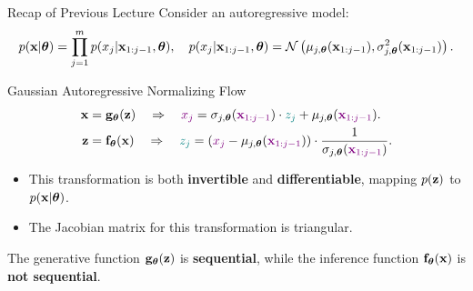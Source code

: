 \documentclass{beamer}
\begin{document}
\begin{frame}{Recap of Previous Lecture}
	Consider an autoregressive model:
	\vspace{-0.3cm}
	{\small
		\[
		p(\mathbf{x} | \boldsymbol{\theta}) = \prod_{j=1}^m p(x_j | \mathbf{x}_{1:j - 1}, \boldsymbol{\theta}), \quad
		p(x_j | \mathbf{x}_{1:j - 1}, \boldsymbol{\theta}) = \mathcal{N} \left(\mu_{j, \boldsymbol{\theta}}(\mathbf{x}_{1:j-1}), \sigma^2_{j, \boldsymbol{\theta}} (\mathbf{x}_{1:j-1})\right).
		\]
	}
	\vspace{-0.5cm}
	\begin{block}{Gaussian Autoregressive Normalizing Flow}
		\vspace{-0.5cm}
		\begin{align*}
			\mathbf{x} &= \mathbf{g}_{\boldsymbol{\theta}}(\mathbf{z}) \quad \Rightarrow \quad {\color{violet} x_j} = \sigma_{j, \boldsymbol{\theta}} ({\color{violet} \mathbf{x}_{1:j-1}}) \cdot {\color{teal} z_j} + \mu_{j, \boldsymbol{\theta}}({\color{violet} \mathbf{x}_{1:j-1}}). \\
			\mathbf{z} &= \mathbf{f}_{\boldsymbol{\theta}}(\mathbf{x}) \quad \Rightarrow \quad {\color{teal} z_j} = \left({\color{violet}x_j} - \mu_{j, \boldsymbol{\theta}}({\color{violet}\mathbf{x}_{1:j-1}}) \right) \cdot \frac{1}{ \sigma_{j, \boldsymbol{\theta}} ({\color{violet}\mathbf{x}_{1:j-1}})}.
		\end{align*}
		\vspace{-0.5cm}
	\end{block}
	\begin{itemize}
		\item This transformation is both \textbf{invertible} and \textbf{differentiable}, mapping $p(\mathbf{z})$ to $p(\mathbf{x} | \boldsymbol{\theta})$.
		\item The Jacobian matrix for this transformation is triangular.
	\end{itemize}
	The generative function $\mathbf{g}_{\boldsymbol{\theta}}(\mathbf{z})$ is \textbf{sequential}, while the inference function $\mathbf{f}_{\boldsymbol{\theta}}(\mathbf{x})$ is \textbf{not sequential}.
\end{frame}
\end{document}
